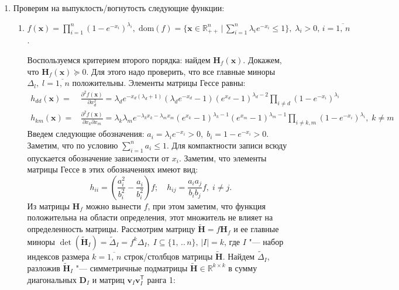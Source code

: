 \documentclass[a4paper,12pt]{article}
\begin{document}
	\begin{enumerate}
		\item
		Проверим на выпуклость/вогнутость следующие функции:
		\begin{enumerate}
			\item 
			$f(\mathbf{x}) = \prod_{i=1}^n (1 - e^{-x_i})^{\lambda_i},\; \text{dom}(f)=\{ \mathbf{x}\in\mathbb{R}^n_{++} \,|\, \sum_{i=1}^n \lambda_i e^{-x_i} \leqslant 1\}, \; \lambda_i > 0,\, i=\overline{1,\,n}$.
			
			Воспользуемся критерием второго порядка: найдем $\mathbf{H}_f(\mathbf{x})$. Докажем, что  $\mathbf{H}_f(\mathbf{x})\succeq0$. Для этого надо проверить, что все главные миноры $\Delta_l,\; l=\overline{1,\,n}$ положительны. Элементы матрицы Гессе равны: 
			\begin{equation*}\begin{aligned}
				h_{dd}(\mathbf{x}) = &\frac{\partial^2 f(\mathbf{x})}{\partial x_d^2} =
				\lambda_d e^{-x_d (\lambda_d + 1)}  (\lambda_d e^{-x_d} - 1) (e^{x_d} - 1)^{\lambda_d -2} \prod_{i \neq d} (1 - e^{-x_i})^{\lambda_i} \\
				h_{km}(\mathbf{x}) = &\frac{\partial^2 f(\mathbf{x})}{\partial x_k \partial x_m} =
				\lambda_k \lambda_m e^{-\lambda_k x_k - \lambda_m x_m} (e^{x_k} - 1)^{\lambda_k - 1} (e^{x_m} - 1)^{\lambda_m - 1} \prod_{i \neq k, m} (1 - e^{-x_i})^{\lambda_i},\; k \neq m
			\end{aligned}\end{equation*}
			Введем следующие обозначения: $a_i = \lambda_i e ^{-x_i} > 0,\; b_i = 1 - e^{-x_i} > 0$. Заметим, что по условию $\sum_{i=1}^n a_i \leqslant 1$. Для компактности записи всюду опускается обозначение зависимости от $x_i$. Заметим, что элементы матрицы Гессе в этих обозначениях имеют вид:
			\begin{equation*}
				h_{ii} = \left(\frac{a_i^2}{b_i^2} - \frac{a_i}{b_i^2}\right) f ;\quad 	h_{ij} = \frac{a_i a_j}{b_i b_j} f, \; i \neq j.
			\end{equation*}
			Из матрицы $\mathbf{H}_f$ можно вынести $f$, при этом заметим, что функция положительна на области определения, этот множитель не влияет на определенность матрицы. Рассмотрим матрицу $\tilde{\mathbf{H}} = f \mathbf{H}_f $ и ее главные миноры $\det(\tilde{\mathbf{H}}_I) =\tilde{\Delta}_I = f^k\Delta_I,\; I\subseteq\{1,\,..\,n\},\, |I| = k$, где $I$ "--- набор индексов размера $k=\overline{1,\,n}$ строк/столбцов матрицы $\tilde{\mathbf{H}}$. Найдем $\tilde{\Delta}_I$, разложив $\tilde{\mathbf{H}}_I$ "--- симметричные подматрицы $\tilde{\mathbf{H}} \in \mathbb{R}^{k\times k}$ в сумму диагональных $\mathbf{D}_I$ и матриц $\mathbf{v}_I\mathbf{v}_I^\mathsf{T}$ ранга 1:

\end{enumerate}
\end{enumerate}
\end{document}
